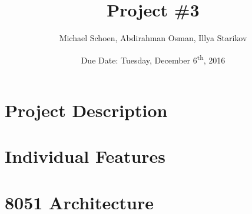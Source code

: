 \documentclass[12pt]{article}
\title{Project \#3}
\date{Due Date: Tuesday, December 6\textsuperscript{th}, 2016}
\author{Michael Schoen, Abdirahman Osman, Illya Starikov}
\begin{document}
\maketitle

\section{Project Description}
\section{Individual Features}
\section{8051 Architecture}
\end{document}
